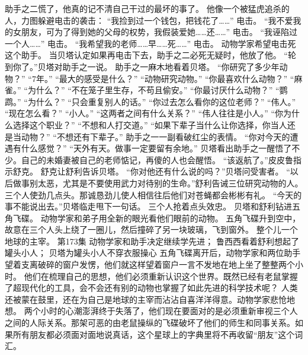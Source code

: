 \documentclass[a4paper,12pt,UTF8,twoside]{ctexbook}
\begin{document}
        助手之二慌了，他真的记不清自己干过的最坏的事了。 
        他像一个被猛虎追杀的人，力图躲避电击的袭击： 
        “我捡到过一个钱包，把钱花了……” 
        电击。 
        “我不爱我的女朋友，可为了得到她的父母的权势，我假装爱她……还……” 
        电击。 
        “我诬陷过一个人……” 
        电击。 
        “我希望我的老师……早……死……” 
        电击。 
        动物学家希望电击死这个助手。 
        当贝塔认定如果再电击下去，助手之二必死无疑时，他放了他。 
        “轮到你了。”贝塔对助手之一说。 
        助手之一麻木地看着贝塔。 
        “你研究了多少年动物？” 
        “7年。” 
        “最大的感受是什么？” 
        “动物研究动物。” 
        “你最喜欢什么动物？” 
        “麻雀。” 
        “为什么？” 
        “不在笼子里生存，不苟且偷安。” 
        “你最讨厌什么动物？” 
        “鹦鹉。” 
        “为什么？” 
        “只会重复别人的话。” 
        “你过去怎么看你的这位老师？” 
        “伟人。” 
        “现在怎么看？” 
        “小人。” 
        “这两者之间有什么关系？” 
        “伟人往往是小人。” 
        “你为什么选择这个职业？” 
        “不想和人打交道。” 
        “如果下辈子当什么让你选择，你当人还是当动物？” 
        “不想还有下辈子。” 
        助手之一一副看破红尘的表情。 
        “你对今天的遭遇有什么感觉？” 
        “天外有天。做事一定要留有余地。” 
        贝塔看出助手之一醒悟了不少。自己的未婚妻被自己的老师惦记，再傻的人也会醒悟。 
        “该返航了。”皮皮鲁指示舒克。 
        舒克让舒利告诉贝塔。 
        “你对他还有什么说的吗？”贝塔问受害者。 
        “以后做事别太恶，尤其是不要使用武力对待别的生命。”舒利告诫三位研究动物的人。 
        三个人使劲几点头。那诚恳劲儿使人相信往后他们对苍蝇都会彬彬有礼。 
        “今天的事不能说出去。”贝塔临走甩下一句话。 
        三个人抢着点头效忠。 
        贝塔和舒利钻进五角飞碟。 
        动物学家和弟子用全新的眼光看他们眼前的动物。 
        五角飞碟升到空中，故意在三个人头上绕了一圈儿，然后撞碎了另一块玻璃，飞到窗外。 
        整个儿一个地球的主宰。   第173集 
        动物学家和助手决定继续学先进； 
        鲁西西看着舒利想起了罐头小人； 
        贝塔为罐头小人不穿衣服操心   
        五角飞碟离开后，动物学家和两位助手望着支离破碎的窗户发愣，他们就这样望着窗户一言不发地在地上坐了整整两个小时。 
        他们在梳理自己的思想，他们必须重新认识这个世界。既然已经有老鼠掌握了超现代化的工具，会不会还有别的动物也掌握了如此先进的科学技术呢？ 
        人类还被蒙在鼓里，还在为自己是地球的主宰而沾沾自喜洋洋得意。动物学家悲怆地想。 
        两个小时的心潮澎湃终于失落了，他们现在要面对的是必须重新审视三个人之间的人际关系。那架可恶的由老鼠操纵的飞碟破坏了他们的师生和同事关系。如果所有朋友都必须面对面地说真话，这个星球上的字典里将不再收留“朋友”这个词汇。 
\end{document}
